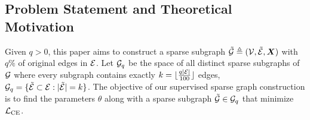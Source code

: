 
\subsection{Problem Statement and Theoretical Motivation}
Given $q>0$, this paper aims to construct a sparse subgraph $\tilde{{\mathcal{G}}} \triangleq ({\mathcal{V}}, \tilde{{\mathcal{E}}},{\bm{X}})$ with $q\%$ of original edges in ${\mathcal{E}}$. Let ${\mathcal{G}}_q$ be the space of all distinct sparse subgraphs of ${\mathcal{G}}$ where every subgraph contains exactly $k = \lfloor \frac{q|{\mathcal{E}}|}{100} \rfloor$ edges, ${\mathcal{G}}_q = \{\tilde{{\mathcal{E}}} \subset {\mathcal{E}} : \lvert\tilde{{\mathcal{E}}}\rvert = k\}$.
The objective of our supervised sparse graph construction is to find the parameters $\theta$ along with a sparse subgraph $\tilde{{\mathcal{G}}} \in {\mathcal{G}}_q$ that minimize ${\mathcal{L}}_\mathrm{CE}$.

